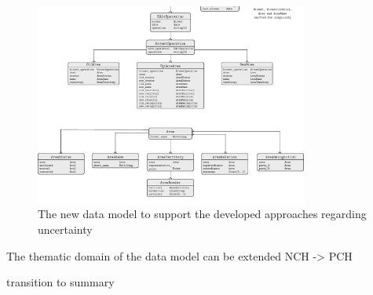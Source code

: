 \begin{figure}[ht]
  \centering
  \includegraphics[width = 0.8\textwidth]{graphics/extensions/new_database_model}
  \caption{The new data model to support the developed approaches regarding uncertainty}
  \label{fig:new_data_model}
\end{figure}

The thematic domain of the data model can be extended
NCH -> PCH






\vspace{2em}

transition to summary